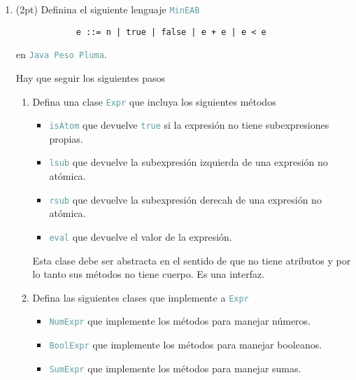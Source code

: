 \documentclass{article}
\newcommand{\tx}[1]{\textcolor{CadetBlue} {\texttt{#1}}}
\newcommand{\pt}[1]{\textcolor{RoyalPurple}{(#1pt)}}
\begin{document}
\begin{enumerate}
        \item \pt{2} Definina el siguiente lenguaje \tx{MinEAB}

        \begin{verbatim}
            e ::= n | true | false | e + e | e < e
        \end{verbatim}

        en \tx{Java Peso Pluma}.

        Hay que seguir los siguientes pasos

        \begin{enumerate}
            \item Defina una clase \tx{Expr} que incluya los siguientes métodos

            \begin{itemize}
                \item \tx{isAtom} que devuelve \tx{true} si la expresión no
                tiene subexpresiones propias.

                \item \tx{lsub} que devuelve la subexpresión izquierda de una
                expresión no atómica.

                \item \tx{rsub} que devuelve la subexpresión derecah de una
                expresión no atómica.

                \item \tx{eval} que devuelve el valor de la expresión.
            \end{itemize}

            Esta clase debe ser abstracta en el sentido de que no tiene 
            atributos y por lo tanto sus métodos no tiene cuerpo. Es una 
            interfaz.

            \item Defina las siguientes clases que implemente a \tx{Expr}
            
            \begin{itemize}
                \item \tx{NumExpr} que implemente los métodos para manejar 
                números.

                \item \tx{BoolExpr} que implemente los métodos para manejar 
                booleanos.

                \item \tx{SumExpr} que implemente los métodos para manejar 
                sumas.


\end{itemize}
\end{enumerate}
\end{enumerate}
\end{document}
